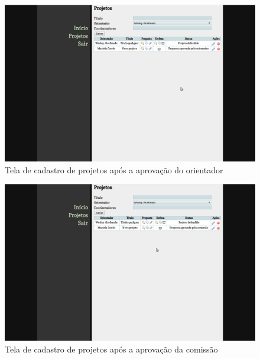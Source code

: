 \begin{figure}[htbp]
\centering
\includegraphics[width=1\textwidth]{fig/telas/processo/aluno_05_proposta_aprovada_orientador.png}
\caption{Tela de cadastro de projetos após a aprovação do orientador}
\label{fig:aluno_05_proposta_aprovada_orientador}
\end{figure}

\begin{figure}[htbp]
\centering
\includegraphics[width=1\textwidth]{fig/telas/processo/aluno_06_proposta_aprovada_comissao.png}
\caption{Tela de cadastro de projetos após a aprovação da comissão}
\label{fig:aluno_06_proposta_aprovada_comissao}
\end{figure}


